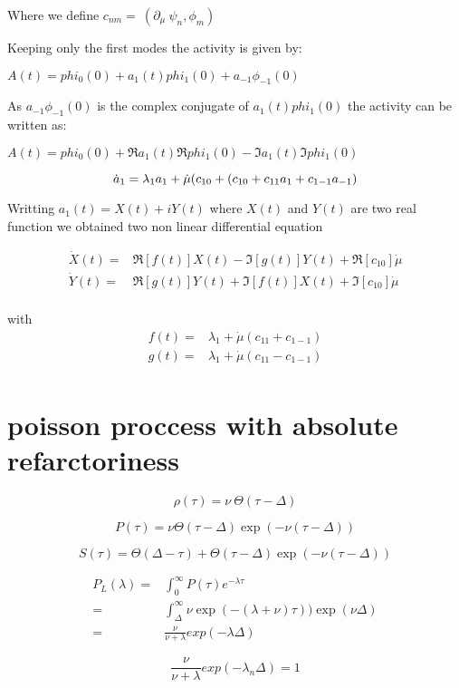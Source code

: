 \documentclass[a4paper,12pt,twoside]{article}
\def \be {\begin{equation}}
\def \ee {\end{equation}}
\begin{document}
Where we define $c_{nm} = \:(\partial_{\mu}\:\psi_n,\phi_m)$

Keeping only the first modes the activity is given by:

$A(t)= phi_0(0)+a_1(t)phi_1(0)+a_{-1}\phi_{-1}(0)$ 

As $a_{-1}\phi_{-1}(0)$ is the complex conjugate of $a_1(t)phi_1(0)$ the activity can be written as:

$A(t)= phi_0(0)+\Re{a_1(t)}\Re{phi_1(0)}-\Im{a_1(t)}\Im{phi_1(0)}$ 


\be
\dot{a}_1=\lambda_1 a_1 + \dot{\mu}(c_{10}+(c_{10}+c_{11}a_1+c_{1-1}a_{-1}) \nonumber \\
\ee

Writting $a_1(t)= X(t) +iY(t)$ where $X(t)$ and $Y(t)$ are two real function we obtained two non linear differential equation

\begin{align}
\dot{X}(t)=&\Re[f(t)]X(t)-\Im[g(t)]Y(t) +\Re[c_{10}]\dot{\mu}\\
\dot{Y}(t)=&\Re[g(t)]Y(t)+\Im[f(t)]X(t) +\Im[c_{10}]\dot{\mu}\\
\end{align}

with
\begin{align}
f(t)=&\lambda_1+ \dot{\mu}(c_{11}+c_{1-1})\\
g(t)=&\lambda_1+ \dot{\mu}(c_{11}-c_{1-1})\\
\end{align}

\section{poisson proccess with absolute refarctoriness}

\be
\rho(\tau)=\nu\:\Theta(\tau-\Delta)
\ee

\be
P(\tau)=\nu \Theta(\tau-\Delta) \exp(-\nu(\tau-\Delta))
\ee


\be
S(\tau)=\Theta(\Delta-\tau) +  \Theta(\tau-\Delta) \exp(-\nu(\tau-\Delta))
\ee

\begin{align}
P_L(\lambda)=&\int_0^\infty P(\tau)e^{-\lambda \tau}\\
=&\int_\Delta^\infty \nu \exp(-(\lambda+\nu)\tau))\exp(\nu \Delta)\\
=&\frac{\nu}{\nu+\lambda}exp(-\lambda \Delta)
\end{align}

\be
\frac{\nu}{\nu+\lambda}exp(-\lambda_n \Delta)=1
\ee
\end{document}
